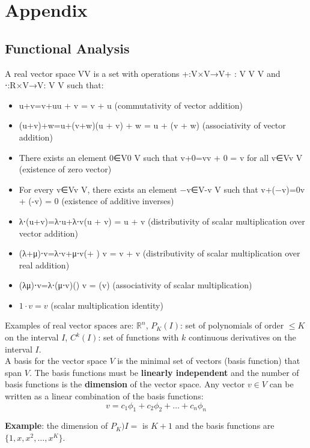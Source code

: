 \section{Appendix}
\subsection*{Functional Analysis}
A real vector space VV is a set with operations +:V×V→V+ : V \times V \to V and ⋅:R×V→V\cdot: \times V \to V such that:

\begin{itemize}
    \item u+v=v+uu + v = v + u (commutativity of vector addition)
    \item (u+v)+w=u+(v+w)(u + v) + w = u + (v + w) (associativity of vector addition)
    \item There exists an element 0∈V0 \in V such that v+0=vv + 0 = v for all v∈Vv \in V (existence of zero vector)
    \item For every v∈Vv \in V, there exists an element −v∈V-v \in V such that v+(−v)=0v + (-v) = 0 (existence of additive inverses)
    \item λ⋅(u+v)=λ⋅u+λ⋅v\lambda \cdot (u + v) = \lambda \cdot u + \lambda \cdot v (distributivity of scalar multiplication over vector addition)
    \item (λ+μ)⋅v=λ⋅v+μ⋅v(\lambda + \mu) \cdot v = \lambda \cdot v + \mu \cdot v (distributivity of scalar multiplication over real addition)
    \item (λμ)⋅v=λ⋅(μ⋅v)(\lambda \mu) \cdot v = \lambda \cdot (\mu \cdot v) (associativity of scalar multiplication)
    \item $1 \cdot v = v$ (scalar multiplication identity)
\end{itemize}


Examples of real vector spaces are: $\mathbb{R}^n$, $P_K(I)$: set of polynomials of order $\leq K$ on the interval $I$, $C^k(I)$: set of functions with $k$ continuous derivatives on the interval $I$.\\

A basis for the vector space $V$ is the minimal set of vectors (basis function) that span $V$. The basis functions must be \textbf{linearly independent} and the number of basis functions is the \textbf{dimension} of the vector space. Any vector $v \in V$ can be written as a linear combination of the basis functions:
\[
    v = c_1 \phi_1 + c_2 \phi_2 + \dots + c_n \phi_n    
\]

\textbf{Example}: the dimension of $P_K)I=$ is $K+1$ and the basis functions are $\{1,x,x^2,\dots,x^K\}$.\\

